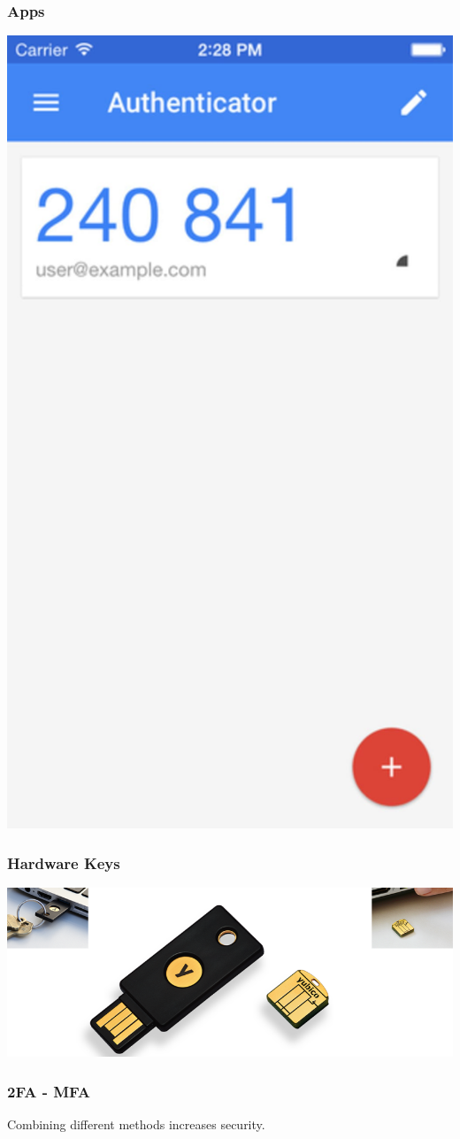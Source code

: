 \documentclass[aspectratio=169]{beamer}              %
\begin{document}
\begin{frame}
	\frametitle{Apps}
    
    \centering
    \includegraphics[width = \textwidth, height = .85\textheight, keepaspectratio]{figures/app.jpeg}

\end{frame}

\begin{frame}
	\frametitle{Hardware Keys}
    
    \centering	

    \includegraphics[width = \textwidth, height = .85\textheight, keepaspectratio]{figures/hardware.png}

\end{frame}

\begin{frame}
	\frametitle{2FA - MFA}
    
    Combining different methods increases security.

\end{frame}
\end{document}
